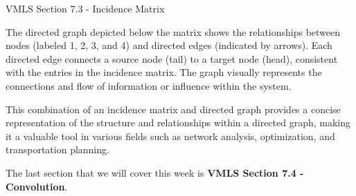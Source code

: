 \begin{notes}{VMLS Section 7.3 - Incidence Matrix}
\begin{Highlight}
\begin{center}
        \end{center}
        The directed graph depicted below the matrix shows the relationships between nodes (labeled 1, 2, 3, and 4) and directed edges (indicated by arrows). Each directed edge connects a source node 
        (tail) to a target node (head), consistent with the entries in the incidence matrix. The graph visually represents the connections and flow of information or influence within the system.

        This combination of an incidence matrix and directed graph provides a concise representation of the structure and relationships within a directed graph, making it a valuable tool in various 
        fields such as network analysis, optimization, and transportation planning.
    \end{Highlight}
\end{notes}

The last section that we will cover this week is \textbf{VMLS Section 7.4 - Convolution}.


